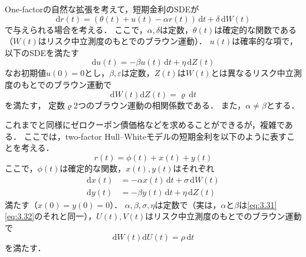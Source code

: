\documentclass[a4paper, lualatex, ja=standard]{bxjsarticle}
\theoremstyle{theorem}
\theoremstyle{definition}
\theoremstyle{definition}
\newcommand{\diff}{\mathrm{d}}
\begin{document}
One-factorの自然な拡張を考えて，短期金利のSDEが
\begin{equation}
  \diff r(t) = (\theta(t)+u(t)-\alpha r(t))\,\diff t + \delta \,\diff W(t)\label{eq:3.31}
\end{equation}
で与えられる場合を考える．
ここで，$\alpha,\delta$は定数，$\theta(t)$は確定的な関数である（$W(t)$はリスク中立測度のもとでのブラウン運動）．
$u(t)$は確率的な項で，以下のSDEを満たす
\begin{equation}
  \diff u(t) = -\beta u(t)\,\diff t + \eta\,\diff Z(t) \label{eq:3.32}
\end{equation}
なお初期値$u(0)=0$とし，$\beta,\varepsilon$は定数，$Z(t)$は$W(t)$とは異なるリスク中立測度のもとでのブラウン運動で
\begin{equation}
  \diff W(t)\diff Z(t) = \varrho\,\diff t \label{eq:3.33}
\end{equation}
を満たす，
定数$\varrho$2つのブラウン運動の相関係数である．
また，$\alpha\neq\beta$とする．

これまでと同様にゼロクーポン債価格などを求めることができるが，複雑である．
ここでは，two-factor Hull--Whiteモデルの短期金利を以下のように表すことを考える．
\begin{equation}
  r(t) = \phi(t) + x(t) + y(t)\label{eq:3.34}
\end{equation}
ここで，$\phi(t)$は確定的な関数，$x(t),y(t)$はそれぞれ
\begin{align}
  \diff x(t) &= -\alpha x(t)\,\diff t + \sigma\,\diff W(t) \label{eq:3.35}\\
  \diff y(t) &= -\beta y(t)\,\diff t + \eta\,\diff Z(t)\label{eq:3.36}
\end{align}
満たす（$x(0)=y(0)=0$）．
$\alpha,\beta,\sigma,\eta$は定数で（実は，$\alpha$と$\beta$は\eqref{eq:3.31}\eqref{eq:3.32}のそれと同一），$U(t),V(t)$はリスク中立測度のもとでのブラウン運動で
\begin{equation}
  \diff W(t)\diff U(t) = \rho\,\diff t\label{eq:3.37}
\end{equation}
を満たす．
\end{document}
